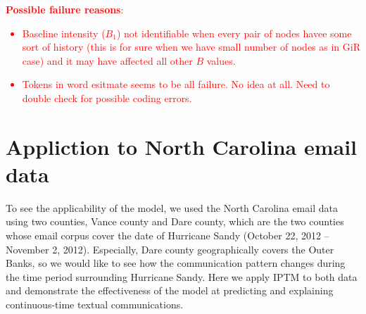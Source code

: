 \documentclass[a4paper]{article}
\begin{document}
\newpage\textcolor{red}{\textbf{Possible failure reasons}:
	\begin{itemize}
		\item  Baseline intensity ($B_1$) not identifiable when every pair of nodes havee some sort of history (this is for sure when we have small number of nodes as in GiR case) and it may have affected all other $B$ values.
		\item Tokens in word esitmate seems to be all failure. No idea at all. Need to double check for possible coding errors.
	\end{itemize}
	}
 \section{Appliction to North Carolina email data}  \label{sec: Application to North Carolina email data}
 To see the applicability of the model, we used the North Carolina email data using two counties, Vance county and Dare county, which are the two counties whose email corpus cover the date of Hurricane Sandy (October 22, 2012 – November 2, 2012). Especially, Dare county geographically covers the Outer Banks, so we would like to see how the communication pattern changes during the time period surrounding Hurricane Sandy. Here we apply IPTM to both data and demonstrate the effectiveness of the model at predicting and explaining continuous-time textual communications.
\end{document}
